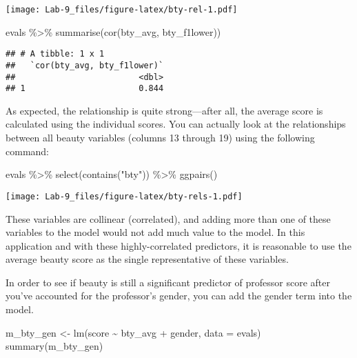 \documentclass[
]{article}
\newenvironment{Shaded}{\begin{snugshade}}{\end{snugshade}}
\newcommand{\AttributeTok}[1]{\textcolor[rgb]{0.77,0.63,0.00}{#1}}
\newcommand{\FunctionTok}[1]{\textcolor[rgb]{0.00,0.00,0.00}{#1}}
\newcommand{\NormalTok}[1]{#1}
\newcommand{\OtherTok}[1]{\textcolor[rgb]{0.56,0.35,0.01}{#1}}
\newcommand{\SpecialCharTok}[1]{\textcolor[rgb]{0.00,0.00,0.00}{#1}}
\newcommand{\StringTok}[1]{\textcolor[rgb]{0.31,0.60,0.02}{#1}}
\begin{document}
\texttt{[image: Lab-9\_files/figure-latex/bty-rel-1.pdf]}

\begin{Shaded}
\begin{Highlighting}[]
\NormalTok{evals }\SpecialCharTok{\%\textgreater{}\%}
    \FunctionTok{summarise}\NormalTok{(}\FunctionTok{cor}\NormalTok{(bty\_avg, bty\_f1lower))}
\end{Highlighting}
\end{Shaded}

\begin{verbatim}
## # A tibble: 1 x 1
##   `cor(bty_avg, bty_f1lower)`
##                         <dbl>
## 1                       0.844
\end{verbatim}

As expected, the relationship is quite strong---after all, the average
score is calculated using the individual scores. You can actually look
at the relationships between all beauty variables (columns 13 through
19) using the following command:

\begin{Shaded}
\begin{Highlighting}[]
\NormalTok{evals }\SpecialCharTok{\%\textgreater{}\%}
    \FunctionTok{select}\NormalTok{(}\FunctionTok{contains}\NormalTok{(}\StringTok{"bty"}\NormalTok{)) }\SpecialCharTok{\%\textgreater{}\%}
    \FunctionTok{ggpairs}\NormalTok{()}
\end{Highlighting}
\end{Shaded}

\texttt{[image: Lab-9\_files/figure-latex/bty-rels-1.pdf]}

These variables are collinear (correlated), and adding more than one of
these variables to the model would not add much value to the model. In
this application and with these highly-correlated predictors, it is
reasonable to use the average beauty score as the single representative
of these variables.

In order to see if beauty is still a significant predictor of professor
score after you've accounted for the professor's gender, you can add the
gender term into the model.

\begin{Shaded}
\begin{Highlighting}[]
\NormalTok{m\_bty\_gen }\OtherTok{\textless{}{-}} \FunctionTok{lm}\NormalTok{(score }\SpecialCharTok{\textasciitilde{}}\NormalTok{ bty\_avg }\SpecialCharTok{+}\NormalTok{ gender, }\AttributeTok{data =}\NormalTok{ evals)}
\FunctionTok{summary}\NormalTok{(m\_bty\_gen)}
\end{Highlighting}
\end{Shaded}
\end{document}

